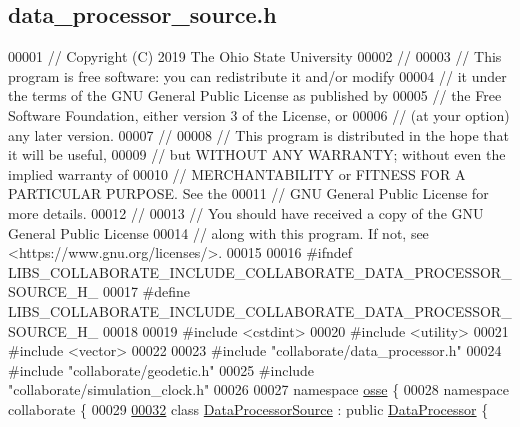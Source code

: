 \hypertarget{data__processor__source_8h_source}{}\subsection{data\+\_\+processor\+\_\+source.\+h}
\label{data__processor__source_8h_source}

\begin{DoxyCode}
00001 \textcolor{comment}{// Copyright (C) 2019 The Ohio State University}
00002 \textcolor{comment}{//}
00003 \textcolor{comment}{// This program is free software: you can redistribute it and/or modify}
00004 \textcolor{comment}{// it under the terms of the GNU General Public License as published by}
00005 \textcolor{comment}{// the Free Software Foundation, either version 3 of the License, or}
00006 \textcolor{comment}{// (at your option) any later version.}
00007 \textcolor{comment}{//}
00008 \textcolor{comment}{// This program is distributed in the hope that it will be useful,}
00009 \textcolor{comment}{// but WITHOUT ANY WARRANTY; without even the implied warranty of}
00010 \textcolor{comment}{// MERCHANTABILITY or FITNESS FOR A PARTICULAR PURPOSE.  See the}
00011 \textcolor{comment}{// GNU General Public License for more details.}
00012 \textcolor{comment}{//}
00013 \textcolor{comment}{// You should have received a copy of the GNU General Public License}
00014 \textcolor{comment}{// along with this program.  If not, see <https://www.gnu.org/licenses/>.}
00015 
00016 \textcolor{preprocessor}{#ifndef LIBS\_COLLABORATE\_INCLUDE\_COLLABORATE\_DATA\_PROCESSOR\_SOURCE\_H\_}
00017 \textcolor{preprocessor}{#define LIBS\_COLLABORATE\_INCLUDE\_COLLABORATE\_DATA\_PROCESSOR\_SOURCE\_H\_}
00018 
00019 \textcolor{preprocessor}{#include <cstdint>}
00020 \textcolor{preprocessor}{#include <utility>}
00021 \textcolor{preprocessor}{#include <vector>}
00022 
00023 \textcolor{preprocessor}{#include "collaborate/data\_processor.h"}
00024 \textcolor{preprocessor}{#include "collaborate/geodetic.h"}
00025 \textcolor{preprocessor}{#include "collaborate/simulation\_clock.h"}
00026 
00027 \textcolor{keyword}{namespace }\hyperlink{namespaceosse}{osse} \{
00028 \textcolor{keyword}{namespace }collaborate \{
00029 
\hyperlink{classosse_1_1collaborate_1_1_data_processor_source}{00032} \textcolor{keyword}{class }\hyperlink{classosse_1_1collaborate_1_1_data_processor_source}{DataProcessorSource} : \textcolor{keyword}{public} \hyperlink{classosse_1_1collaborate_1_1_data_processor}{DataProcessor} \{

\end{DoxyCode}
